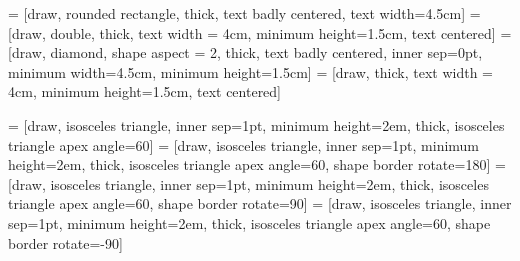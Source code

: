 



 = [draw, rounded rectangle, thick, text badly centered, text width=4.5cm]
 = [draw, double, thick, text width = 4cm, minimum height=1.5cm, text centered]
 = [draw, diamond, shape aspect = 2, thick, text badly centered, inner sep=0pt, minimum width=4.5cm, minimum height=1.5cm]
 = [draw, thick, text width = 4cm, minimum height=1.5cm, text centered]
 

 = [draw, isosceles triangle, inner sep=1pt, minimum height=2em, thick, isosceles triangle apex angle=60]
 = [draw, isosceles triangle, inner sep=1pt, minimum height=2em, thick, isosceles triangle apex angle=60, shape border rotate=180]
 = [draw, isosceles triangle, inner sep=1pt, minimum height=2em, thick, isosceles triangle apex angle=60, shape border rotate=90]
 = [draw, isosceles triangle, inner sep=1pt, minimum height=2em, thick, isosceles triangle apex angle=60, shape border rotate=-90]



\newcommand{\TikZsaturation}{
\begin{tikzpicture}
	\draw[->, very thin] (-3mm,0) -- (3mm,0);
	\draw[->, very thin] (0,-3mm) -- (0,3mm);

	\draw[thin] (-3mm,-1.5mm) -- (-1.5mm,-1.5mm);
	\draw[thin] (-1.5mm,-1.5mm) -- ( 1.5mm, 1.5mm);
	\draw[thin] ( 1.5mm, 1.5mm) -- ( 3mm, 1.5mm);
\end{tikzpicture}
}

\newcommand{\TikZzoh}{
\begin{tikzpicture}
	\draw[thin] (-3mm,-1.5mm) -| (-1.5mm,-0.5mm) -| (0mm,2mm) -| (1.5mm,0mm) -| (3mm,1mm);
\end{tikzpicture}
}

